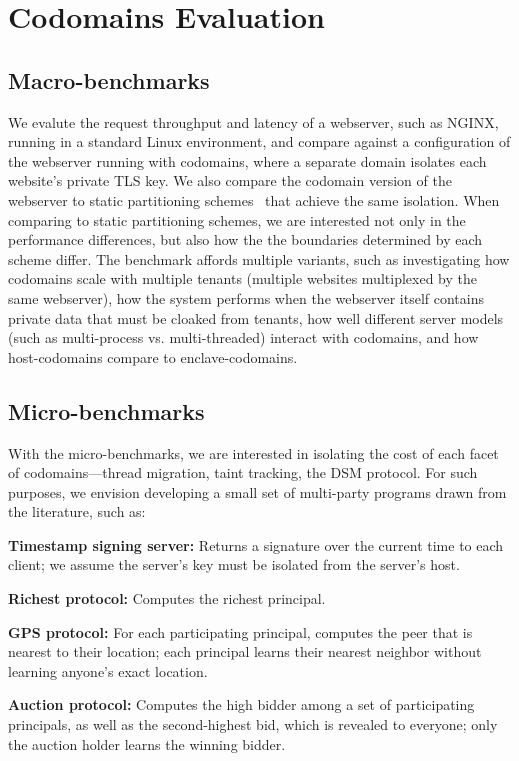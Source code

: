 \section{Codomains Evaluation}
\label{sec:codomains-eval}


\subsection{Macro-benchmarks}

%
We evalute the request throughput and latency of a webserver, such as NGINX,
running in a standard Linux environment, and compare against a configuration of
the webserver running with codomains, where a separate domain isolates each
website's private TLS key.
%
We also compare the codomain version of the webserver to 
static partitioning schemes~\cite{eleos,glamdring,privtrans} that achieve
the same isolation.
%
When comparing to static partitioning schemes, we are interested not only in the
performance differences, but also how the the boundaries determined by each
scheme differ.
%
The benchmark affords multiple variants, such as investigating how codomains
scale with multiple tenants (multiple websites multiplexed by the same
webserver), how the system performs when the webserver itself contains
private data that must be cloaked from tenants, how well different server
models (such as multi-process vs. multi-threaded) interact with codomains, and
how host-codomains compare to enclave-codomains.






\subsection{Micro-benchmarks}

With the micro-benchmarks, we are interested in isolating the cost of each
facet of codomains---thread migration, taint tracking, the DSM protocol.
%
For such purposes, we envision developing a small set of multi-party programs
drawn from the literature, such as:

\begin{widelist}
\item \textbf{Timestamp signing server:} Returns a signature over the current
time to each client; we assume the server's key must be isolated from the
server's host.
%
\item \textbf{Richest protocol:} Computes the richest principal.
%
\item \textbf{GPS protocol:} For each participating principal,
computes the peer that is nearest to their location; each principal learns
their nearest neighbor without learning anyone's exact location.
%
\item \textbf{Auction protocol:} Computes the high bidder among a set of
participating principals, as well as the second-highest bid, which is revealed
to everyone; only the auction holder learns the winning bidder.
\end{widelist}

